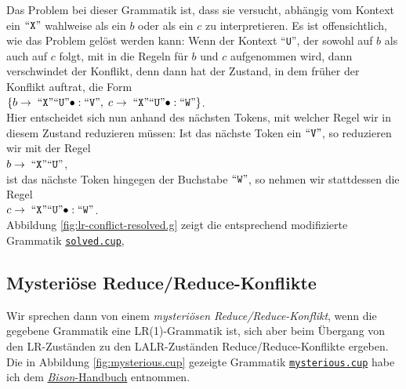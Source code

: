 Das Problem bei dieser Grammatik ist, dass sie versucht, abh\"angig vom Kontext ein $\mbox{``\texttt{X}''}$ wahlweise
als ein $b$ oder als ein $c$ zu interpretieren.  Es ist offensichtlich, wie das Problem gel\"ost werden
kann:  Wenn der Kontext ``\texttt{U}'', der sowohl auf $b$ als auch auf $c$ folgt, mit in
die Regeln f\"ur $b$ und $c$ aufgenommen wird, dann verschwindet der Konflikt, denn dann hat der
Zustand, in dem fr\"uher der Konflikt auftrat, die Form
\\[0.2cm]
\hspace*{1.3cm}
$\{ b \rightarrow \;\mbox{``\texttt{X}''} \mbox{``\texttt{U}''}\bullet: \mbox{``\texttt{V}''},\; 
    c \rightarrow \;\mbox{``\texttt{X}''} \mbox{``\texttt{U}''}\bullet: \mbox{``\texttt{W}''} 
\}
$.
\\[0.2cm]  
Hier entscheidet sich nun anhand des n\"achsten Tokens, mit welcher Regel wir in diesem Zustand
reduzieren m\"ussen:  Ist das n\"achste Token ein $\mbox{``\texttt{V}''}$, so reduzieren wir mit der Regel
\\[0.2cm]
\hspace*{1.3cm}
$b \rightarrow \;\mbox{``\texttt{X}''} \mbox{``\texttt{U}''}$,
\\[0.2cm]
ist das n\"achste Token hingegen der Buchstabe $\mbox{``\texttt{W}''}$, so nehmen wir stattdessen die Regel
\\[0.2cm]
\hspace*{1.3cm}
$c \rightarrow \;\mbox{``\texttt{X}''} \mbox{``\texttt{U}''}\bullet: \mbox{``\texttt{W}''}$.
\\[0.2cm]
Abbildung
\ref{fig:lr-conflict-resolved.g} zeigt die entsprechend modifizierte Grammatik
\href{https://github.com/karlstroetmann/Formal-Languages/tree/master/Cup/LookAheadConflict/solved.cup}{\texttt{solved.cup}},

\subsection{Mysteri\"ose Reduce/Reduce-Konflikte}
Wir sprechen dann von einem \emph{mysteri\"osen Reduce/Reduce-Konflikt}, wenn die gegebene Grammatik eine
LR(1)-Grammatik ist, sich aber beim \"Ubergang von den LR-Zust\"anden zu den LALR-Zust\"anden Reduce/Reduce-Konflikte
ergeben.  Die in Abbildung \ref{fig:mysterious.cup} gezeigte Grammatik 
\href{https://github.com/karlstroetmann/Formal-Languages/tree/master/Cup/MysteriousConflict/mysterious.cup}{\texttt{mysterious.cup}}
habe ich dem 
\href{http://www.gnu.org/software/bison/manual/}{\textsl{Bison}-Handbuch} entnommen. 


